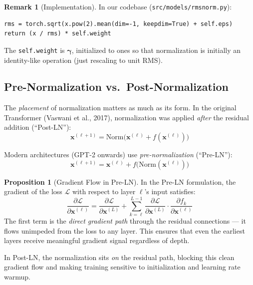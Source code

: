 \documentclass[11pt, a4paper]{article}
\theoremstyle{definition}
\newtheorem{remark}{Remark}[section]
\newtheorem{proposition}{Proposition}[section]
\newcommand{\vx}{\bm{x}}
\begin{document}
\begin{remark}[Implementation]
In our codebase (\texttt{src/models/rmsnorm.py}):
\begin{lstlisting}
rms = torch.sqrt(x.pow(2).mean(dim=-1, keepdim=True) + self.eps)
return (x / rms) * self.weight
\end{lstlisting}
The \texttt{self.weight} is $\bm{\gamma}$, initialized to ones so that normalization is initially an identity-like operation (just rescaling to unit RMS).
\end{remark}

\subsection{Pre-Normalization vs.\ Post-Normalization}

The \emph{placement} of normalization matters as much as its form. In the original Transformer (Vaswani et al., 2017), normalization was applied \emph{after} the residual addition (``Post-LN''):
\begin{equation}
    \vx^{(\ell+1)} = \mathrm{Norm}\bigl(\vx^{(\ell)} + f(\vx^{(\ell)})\bigr) \tag{Post-LN}
\end{equation}

Modern architectures (GPT-2 onwards) use \emph{pre-normalization} (``Pre-LN''):
\begin{equation}
    \vx^{(\ell+1)} = \vx^{(\ell)} + f\bigl(\mathrm{Norm}(\vx^{(\ell)})\bigr) \tag{Pre-LN}
\end{equation}

\begin{proposition}[Gradient Flow in Pre-LN]
In the Pre-LN formulation, the gradient of the loss $\mathcal{L}$ with respect to layer $\ell$'s input satisfies:
\begin{equation}
    \frac{\partial \mathcal{L}}{\partial \vx^{(\ell)}} = \frac{\partial \mathcal{L}}{\partial \vx^{(L)}} + \sum_{k=\ell}^{L-1} \frac{\partial \mathcal{L}}{\partial \vx^{(L)}} \cdot \frac{\partial f_k}{\partial \vx^{(\ell)}}
\end{equation}
The first term is the \emph{direct gradient path} through the residual connections — it flows unimpeded from the loss to any layer. This ensures that even the earliest layers receive meaningful gradient signal regardless of depth.
\end{proposition}

In Post-LN, the normalization sits \emph{on} the residual path, blocking this clean gradient flow and making training sensitive to initialization and learning rate warmup.
\end{document}
